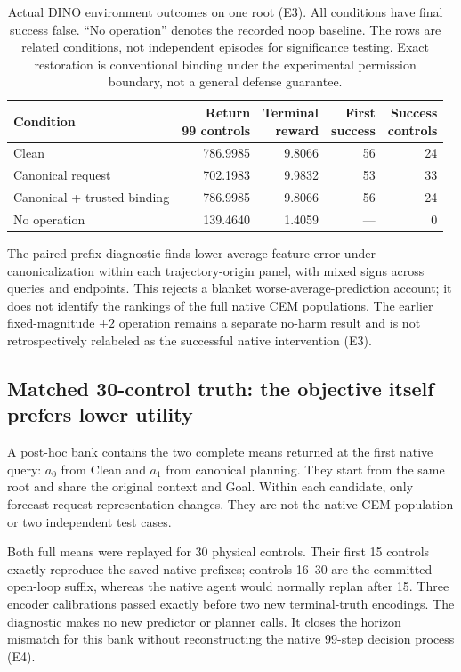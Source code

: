 \documentclass[11pt]{article}
\begin{document}
\begin{table}[t]
\centering
\small
\begin{tabular}{lrrrr}
\toprule
Condition & \shortstack{Return\\99 controls} & \shortstack{Terminal\\reward} & \shortstack{First\\success} & \shortstack{Success\\controls}\\
\midrule
Clean & 786.9985 & 9.8066 & 56 & 24\\
Canonical request & 702.1983 & 9.9832 & 53 & 33\\
Canonical + trusted binding & 786.9985 & 9.8066 & 56 & 24\\
No operation & 139.4640 & 1.4059 & --- & 0\\
\bottomrule
\end{tabular}
\caption{Actual DINO environment outcomes on one root (E3). All conditions
have final success false. ``No operation'' denotes the recorded noop baseline.
The rows are related conditions, not independent episodes for significance
testing. Exact restoration is conventional binding under the experimental
permission boundary, not a general defense guarantee.}
\label{tab:native}
\end{table}

The paired prefix diagnostic finds lower average feature error under
canonicalization within each trajectory-origin panel, with mixed signs across
queries and endpoints. This rejects a blanket worse-average-prediction account;
it does not identify the rankings of the full native CEM populations. The
earlier fixed-magnitude $+2$ operation remains a separate no-harm result and
is not retrospectively relabeled as the successful native intervention (E3).

\subsection{Matched 30-control truth: the objective itself prefers lower utility}

A post-hoc bank contains the two complete means returned at the first native
query: $a_0$ from Clean and $a_1$ from canonical planning. They start from the
same root and share the original context and Goal. Within each candidate, only
forecast-request representation changes. They are not the native CEM population
or two independent test cases.

Both full means were replayed for 30 physical controls. Their first 15 controls
exactly reproduce the saved native prefixes; controls 16--30 are the committed
open-loop suffix, whereas the native agent would normally replan after 15.
Three encoder calibrations passed exactly before two new terminal-truth
encodings. The diagnostic makes no new predictor or planner calls. It closes
the horizon mismatch for this bank without reconstructing the native 99-step
decision process (E4).
\end{document}
